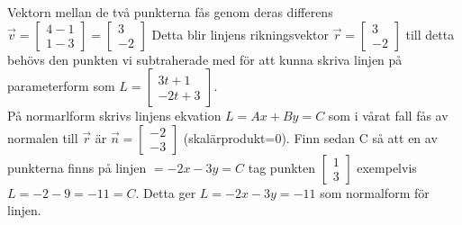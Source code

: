 Vektorn mellan de två punkterna fås genom deras differens $\vec{v}=\begin{bmatrix} 4-1\\1-3 \end{bmatrix}= \begin{bmatrix} 3\\-2 \end{bmatrix}$ Detta blir linjens rikningsvektor $\vec{r}=\begin{bmatrix} 3\\-2 \end{bmatrix}$ till detta behövs den punkten vi subtraherade med för att kunna skriva linjen på parameterform som $L=\begin{bmatrix} 3t+1 \\-2t+3\end{bmatrix}$.
\\
På normarlform skrivs linjens ekvation $L=Ax+By=C$ som i vårat fall fås av normalen till $\vec{r}$ är $\vec{n}=\begin{bmatrix} -2\\-3 \end{bmatrix}$ (skalärprodukt=0). Finn sedan C så att en av punkterna finns på linjen $=-2x-3y=C$ tag punkten $\begin{bmatrix}1\\3\end{bmatrix}$ exempelvis $L=-2-9=-11=C$. Detta ger $L=-2x-3y=-11$ som normalform för linjen.